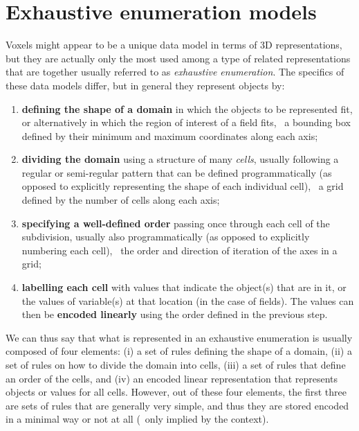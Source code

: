 \section{Exhaustive enumeration models}

Voxels might appear to be a unique data model in terms of 3D representations, but they are actually only the most used among a type of related representations that are together usually referred to as \emph{exhaustive enumeration}.
The specifics of these data models differ, but in general they represent objects by:

\begin{enumerate}

\item \textbf{defining the shape of a domain} in which the objects to be represented fit, or alternatively in which the region of interest of a field fits, \eg\ a bounding box defined by their minimum and maximum coordinates along each axis;

\item \textbf{dividing the domain} using a structure of many \emph{cells}, usually following a regular or semi-regular pattern that can be defined programmatically (as opposed to explicitly representing the shape of each individual cell), \eg\ a grid defined by the number of cells along each axis;

\item \textbf{specifying a well-defined order} passing once through each cell of the subdivision, usually also programmatically (as opposed to explicitly numbering each cell), \eg\ the order and direction of iteration of the axes in a grid;

\item \textbf{labelling each cell} with values that indicate the object(s) that are in it, or the values of variable(s) at that location (in the case of fields). The values can then be \textbf{encoded linearly} using the order defined in the previous step.

\end{enumerate}

We can thus say that what is represented in an exhaustive enumeration is usually composed of four elements: (i) a set of rules defining the shape of a domain, (ii) a set of rules on how to divide the domain into cells, (iii) a set of rules that define an order of the cells, and (iv) an encoded linear representation that represents objects or values for all cells.
However, out of these four elements, the first three are sets of rules that are generally very simple, and thus they are stored encoded in a minimal way or not at all (\ie\ only implied by the context).

